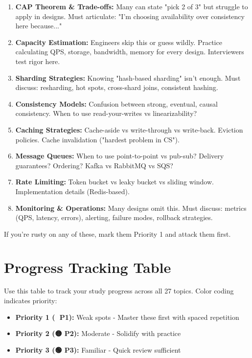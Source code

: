 \documentclass[10pt]{article}
\begin{document}
\begin{enumerate}
\item \textbf{CAP Theorem \& Trade-offs:} Many can state "pick 2 of 3" but struggle to apply in designs. Must articulate: "I'm choosing availability over consistency here because..."

\item \textbf{Capacity Estimation:} Engineers skip this or guess wildly. Practice calculating QPS, storage, bandwidth, memory for every design. Interviewers test rigor here.

\item \textbf{Sharding Strategies:} Knowing "hash-based sharding" isn't enough. Must discuss: resharding, hot spots, cross-shard joins, consistent hashing.

\item \textbf{Consistency Models:} Confusion between strong, eventual, causal consistency. When to use read-your-writes vs linearizability?

\item \textbf{Caching Strategies:} Cache-aside vs write-through vs write-back. Eviction policies. Cache invalidation ("hardest problem in CS").

\item \textbf{Message Queues:} When to use point-to-point vs pub-sub? Delivery guarantees? Ordering? Kafka vs RabbitMQ vs SQS?

\item \textbf{Rate Limiting:} Token bucket vs leaky bucket vs sliding window. Implementation details (Redis-based).

\item \textbf{Monitoring \& Operations:} Many designs omit this. Must discuss: metrics (QPS, latency, errors), alerting, failure modes, rollback strategies.
\end{enumerate}

If you're rusty on any of these, mark them Priority 1 and attack them first.

\newpage

\section{Progress Tracking Table}

Use this table to track your study progress across all 27 topics. Color coding indicates priority:

\begin{itemize}
\item {} \textbf{Priority 1 (🔴 P1):} Weak spots - Master these first with spaced repetition
\item {} \textbf{Priority 2 (🟡 P2):} Moderate - Solidify with practice
\item {} \textbf{Priority 3 (🟢 P3):} Familiar - Quick review sufficient
\end{itemize}
\end{document}
